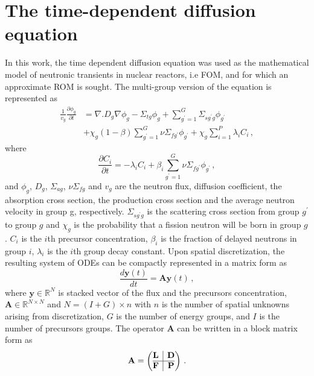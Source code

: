 \documentclass[review,number,sort&compress,12pt]{elsarticle}
\begin{document}
\section{The time-dependent diffusion equation}
\label{sec:fom}
In this work, the time dependent diffusion equation was used as the mathematical model of neutronic transients in nuclear reactors, i.e FOM, and for which an approximate ROM is sought.
The multi-group version of the equation is represented as
\begin{equation}
\begin{split}
\frac{1}{v_g} \frac{\partial\phi_g}{\partial t} &= 
\nabla. D_g\nabla\phi_g - \Sigma_{tg}\phi_g + \sum_{g^\prime=1}^{G}{\Sigma_{sg^\prime g}}\phi_{g^\prime} \\
&+ \chi_g(1-\beta)\sum_{g^\prime = 1}^{G}\nu\Sigma_{fg^\prime}\phi_{g^\prime}  
+ \chi_g\sum_{i=1}^{P} \lambda_i C_i \, ,
\end{split}
\label{time_diff}
\end{equation}
where 
\begin{equation*}
\frac{\partial C_i}{\partial t} = -\lambda_i C_i + \beta_i \sum_{g^\prime=1}^{G} \nu\Sigma_{fg^\prime} \phi_{g^\prime} \, ,
\end{equation*}
and $\phi_g$, $D_g$, $\Sigma_{ag}$, $\nu\Sigma_{fg}$ and $v_g$ are the neutron flux, diffusion coefficient, the absorption cross section, the production cross section and the average neutron velocity in group g, respectively. $\Sigma_{sg^\prime g}$ is the scattering cross section from group $g^\prime$ to group $g$ 
and $\chi_g$ is the probability that a fission neutron will be born in group $g$.
$C_i$ is the $i$th precursor concentration, $\beta_i$ is the fraction of delayed neutrons in group $i$, $\lambda_i$ is the $i$th group decay constant.
Upon spatial discretization, the resulting system of ODEs can be compactly represented in a matrix form as  
\begin{equation}
\frac{d\mathbf{y}(t)}{dt} = \mathbf{A}\mathbf{y}(t) \, ,
\label{eq:transient fom}
\end{equation}
where $\mathbf{y}\in\mathbb{R}^{N}$ is stacked vector of the flux and the precursors concentration, $\mathbf{A}\in\mathbb{R}^{N\times N}$ and $N = (I + G)\times n$ with $n$ is the number of spatial unknowns arising from discretization, $G$ is the number of energy groups, and $I$ is the number of precursors groups.
The operator $\mathbf{A}$ can be written in a block matrix form as
\begin{equation}
\mathbf{A} =  \left(\begin{array}{@{}c|c@{}}
\mathbf{L} & \mathbf{D} \\
\hline
\mathbf{F} & \mathbf{P}
\end{array}\right) \, .
\end{equation} 
\end{document}
